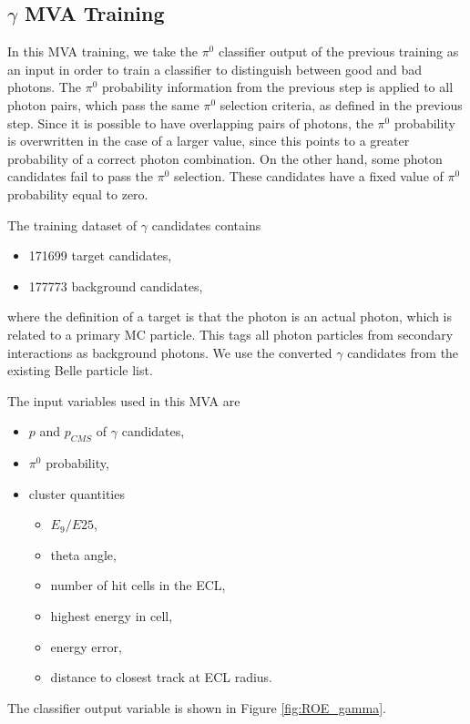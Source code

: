 \subsection{\texorpdfstring{$\gamma$}{γ} MVA Training}

In this MVA training, we take the $\pi^0$ classifier output of the previous training as an input in order to train a classifier to distinguish between good and bad photons. The $\pi^0$ probability information from the previous step is applied to all photon pairs, which pass the same $\pi^0$ selection criteria, as defined in the previous step. Since it is possible to have overlapping pairs of photons, the $\pi^0$ probability is overwritten in the case of a larger value, since this points to a greater probability of a correct photon combination. On the other hand, some photon candidates fail to pass the $\pi^0$ selection. These candidates have a fixed value of $\pi^0$ probability equal to zero.

The training dataset of $\gamma$ candidates contains
\begin{itemize}
	\item 171699 target candidates,
	\item 177773 background candidates,
\end{itemize}
where the definition of a target is that the photon is an actual photon, which is related to a primary MC particle. This tags all photon particles from secondary interactions as background photons. We use the converted $\gamma$ candidates from the existing Belle particle list. 

The input variables used in this MVA are
\begin{itemize}
	\item $p$ and $p_{CMS}$ of $\gamma$ candidates,
	\item $\pi^0$ probability,
	\item cluster quantities
	\begin{itemize}
		\item $E_9/E{25}$,
		\item theta angle,
		\item number of hit cells in the ECL,
		\item highest energy in cell,
		\item energy error,
		\item distance to closest track at ECL radius.
	\end{itemize}
\end{itemize}

The classifier output variable is shown in Figure \ref{fig:ROE_gamma}.

